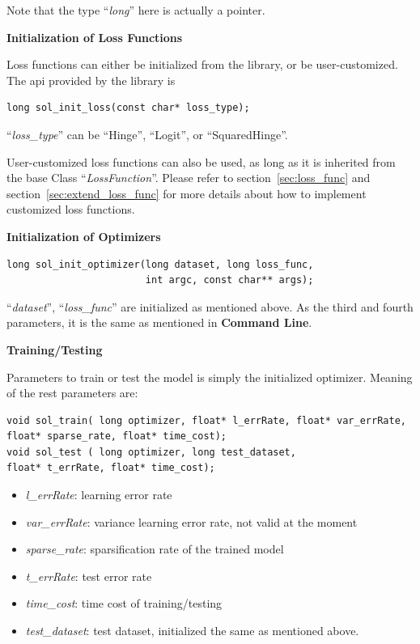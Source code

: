 \documentclass[11pt,a4paper]{article}
\newlength{\wideitemsep}
\let\olditem\item
\renewcommand{\item}{\setlength{\itemsep}{\wideitemsep}\olditem}
\begin{document}
Note that the type ``\emph{long}'' here is actually  a pointer.

\vspace{4mm}\hspace{-5mm}\textbf{Initialization of Loss Functions}
\vspace{2mm}

Loss functions can either be initialized from the library, or be
user-customized. The api provided by the library is
\lstset{language=C++}
\begin{lstlisting}
long sol_init_loss(const char* loss_type);
\end{lstlisting}
``\emph{loss\_type}'' can be ``Hinge'', ``Logit'', or ``SquaredHinge''.

User-customized loss functions can also be used, as long as it is inherited
from the base Class ``\emph{LossFunction}''. Please refer
to section~\ref{sec:loss_func} and section~\ref{sec:extend_loss_func} for more
details about how to implement customized loss functions.

\vspace{4mm}\hspace{-5mm}\textbf{Initialization of Optimizers}
\vspace{2mm}
\lstset{language=C++}
\begin{lstlisting}
long sol_init_optimizer(long dataset, long loss_func, 
                        int argc, const char** args);
\end{lstlisting}
``\emph{dataset}'', ``\emph{loss\_func}'' are initialized as mentioned above.
As the third and fourth parameters, it is the same as mentioned in
\textbf{Command Line}.

\vspace{4mm}\hspace{-5mm}\textbf{Training/Testing}
\vspace{2mm}

Parameters to train or test the model is simply the initialized optimizer.
Meaning of the rest parameters are:
\lstset{language=C++}
\begin{lstlisting}
void sol_train( long optimizer, float* l_errRate, float* var_errRate, 
float* sparse_rate, float* time_cost);
void sol_test ( long optimizer, long test_dataset,  
float* t_errRate, float* time_cost);
\end{lstlisting}


\begin{itemize}
    \item \emph{l\_errRate}: learning error rate
    \item \emph{var\_errRate}: variance learning error rate, not valid at the
        moment
    \item \emph{sparse\_rate}: sparsification rate of the trained model
    \item \emph{t\_errRate}: test error rate
    \item \emph{time\_cost}: time cost of training/testing
    \item \emph{test\_dataset}: test dataset, initialized the same as mentioned
        above.
\end{itemize}
\end{document}
